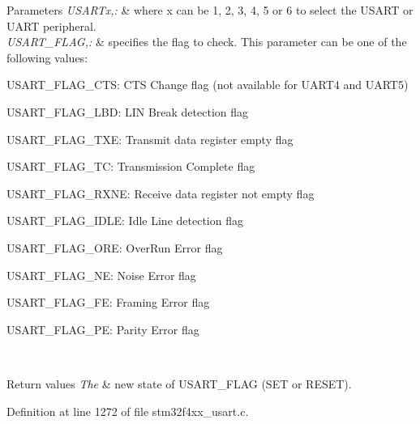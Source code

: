 \begin{DoxyParams}{Parameters}
{\em U\-S\-A\-R\-Tx,\-:} & where x can be 1, 2, 3, 4, 5 or 6 to select the U\-S\-A\-R\-T or U\-A\-R\-T peripheral. \\
\hline
{\em U\-S\-A\-R\-T\-\_\-\-F\-L\-A\-G,\-:} & specifies the flag to check. This parameter can be one of the following values\-: \begin{DoxyItemize}
\item U\-S\-A\-R\-T\-\_\-\-F\-L\-A\-G\-\_\-\-C\-T\-S\-: C\-T\-S Change flag (not available for U\-A\-R\-T4 and U\-A\-R\-T5) \item U\-S\-A\-R\-T\-\_\-\-F\-L\-A\-G\-\_\-\-L\-B\-D\-: L\-I\-N Break detection flag \item U\-S\-A\-R\-T\-\_\-\-F\-L\-A\-G\-\_\-\-T\-X\-E\-: Transmit data register empty flag \item U\-S\-A\-R\-T\-\_\-\-F\-L\-A\-G\-\_\-\-T\-C\-: Transmission Complete flag \item U\-S\-A\-R\-T\-\_\-\-F\-L\-A\-G\-\_\-\-R\-X\-N\-E\-: Receive data register not empty flag \item U\-S\-A\-R\-T\-\_\-\-F\-L\-A\-G\-\_\-\-I\-D\-L\-E\-: Idle Line detection flag \item U\-S\-A\-R\-T\-\_\-\-F\-L\-A\-G\-\_\-\-O\-R\-E\-: Over\-Run Error flag \item U\-S\-A\-R\-T\-\_\-\-F\-L\-A\-G\-\_\-\-N\-E\-: Noise Error flag \item U\-S\-A\-R\-T\-\_\-\-F\-L\-A\-G\-\_\-\-F\-E\-: Framing Error flag \item U\-S\-A\-R\-T\-\_\-\-F\-L\-A\-G\-\_\-\-P\-E\-: Parity Error flag \end{DoxyItemize}
\\
\hline
\end{DoxyParams}

\begin{DoxyRetVals}{Return values}
{\em The} & new state of U\-S\-A\-R\-T\-\_\-\-F\-L\-A\-G (S\-E\-T or R\-E\-S\-E\-T). \\
\hline
\end{DoxyRetVals}


Definition at line 1272 of file stm32f4xx\-\_\-usart.\-c.

